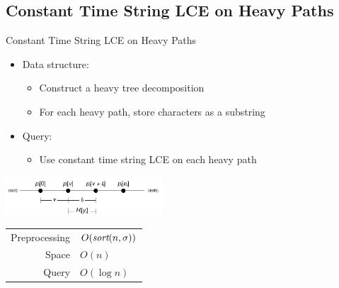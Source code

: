 \documentclass{beamer}
\begin{document}
\subsection{Constant Time String LCE on Heavy Paths}
\begin{frame}{Constant Time String LCE on Heavy Paths}
    \begin{multicols}{2}{
        \begin{itemize}
            \item Data structure:
            \begin{itemize}
                \item Construct a heavy tree decomposition
                \item For each heavy path, store characters as a substring
            \end{itemize}
            \item Query:
            \begin{itemize}
                \item Use constant time string LCE on each heavy path
            \end{itemize}
        \end{itemize}
        \begin{center}
            \includegraphics[width=0.44\textwidth,page=4]{../doc/tree-fingerprint.pdf}
        \end{center}
        \begin{tabular}{r l}
            Preprocessing & $O(\textit{sort}(n,\sigma))$ \\
            Space & $O(n)$\\
            Query & $O(\log n)$ \\
        \end{tabular}
    }
    \end{multicols}
\end{frame}
\end{document}
